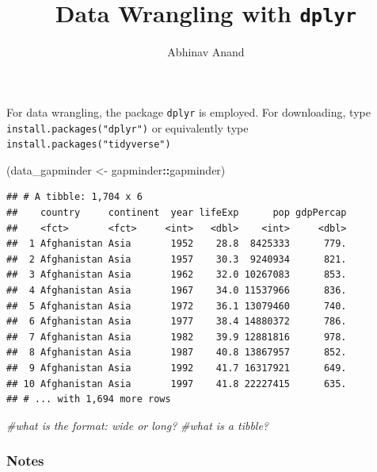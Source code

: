 \documentclass[]{article}
\title{Data Wrangling with \texttt{dplyr}}
\author{Abhinav Anand}
\date{}
\newenvironment{Shaded}{\begin{snugshade}}{\end{snugshade}}
\newcommand{\StringTok}[1]{\textcolor[rgb]{0.31,0.60,0.02}{#1}}
\newcommand{\CommentTok}[1]{\textcolor[rgb]{0.56,0.35,0.01}{\textit{#1}}}
\newcommand{\OperatorTok}[1]{\textcolor[rgb]{0.81,0.36,0.00}{\textbf{#1}}}
\newcommand{\NormalTok}[1]{#1}
\begin{document}
\maketitle

For data wrangling, the package \texttt{dplyr} is employed. For
downloading, type \texttt{install.packages("dplyr")} or equivalently
type \texttt{install.packages("tidyverse")}

\begin{Shaded}
\begin{Highlighting}[]
\NormalTok{(data_gapminder <-}\StringTok{ }\NormalTok{gapminder}\OperatorTok{::}\NormalTok{gapminder)}
\end{Highlighting}
\end{Shaded}

\begin{verbatim}
## # A tibble: 1,704 x 6
##    country     continent  year lifeExp      pop gdpPercap
##    <fct>       <fct>     <int>   <dbl>    <int>     <dbl>
##  1 Afghanistan Asia       1952    28.8  8425333      779.
##  2 Afghanistan Asia       1957    30.3  9240934      821.
##  3 Afghanistan Asia       1962    32.0 10267083      853.
##  4 Afghanistan Asia       1967    34.0 11537966      836.
##  5 Afghanistan Asia       1972    36.1 13079460      740.
##  6 Afghanistan Asia       1977    38.4 14880372      786.
##  7 Afghanistan Asia       1982    39.9 12881816      978.
##  8 Afghanistan Asia       1987    40.8 13867957      852.
##  9 Afghanistan Asia       1992    41.7 16317921      649.
## 10 Afghanistan Asia       1997    41.8 22227415      635.
## # ... with 1,694 more rows
\end{verbatim}

\begin{Shaded}
\begin{Highlighting}[]
\CommentTok{#what is the format: wide or long?}
\CommentTok{#what is a tibble?}
\end{Highlighting}
\end{Shaded}

\subsubsection{Notes}\label{notes}
\end{document}
